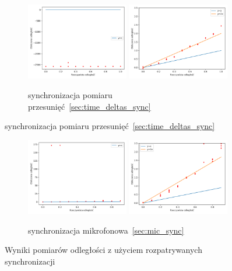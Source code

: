 \begin{figure}[H]
    \ContinuedFloat\centering
    \begin{subfigure}{\textwidth}
        \centering
        \includegraphics[width=0.49\textwidth]{pics/time_deltas_dist/dists.png}
        \includegraphics[width=0.49\textwidth]{pics/time_deltas_dist/dists_close.png}
        \caption{synchronizacja pomiaru przesunięć~\ref{sec:time_deltas_sync}}
        \label{pic:time_deltas_dist}
    \end{subfigure}
\end{figure}
\begin{figure}[H]
    \ContinuedFloat\centering
    \begin{subfigure}{\textwidth}
        \centering
        \includegraphics[width=0.49\textwidth]{pics/mic_sync_dist/dists.png}
        \includegraphics[width=0.49\textwidth]{pics/mic_sync_dist/dists_close.png}
        \caption{synchronizacja mikrofonowa~\ref{sec:mic_sync}}
        \label{pic:mic_sync_dist}
    \end{subfigure}
    \caption{Wyniki pomiarów odległości z użyciem rozpatrywanych synchronizacji}
    \label{fig:sync_test}
\end{figure}

